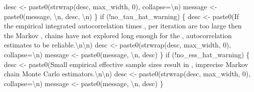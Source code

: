 \documentclass[
  letterpaper,
  DIV=11,
  numbers=noendperiod]{scrartcl}
\newenvironment{Shaded}{\begin{snugshade}}{\end{snugshade}}
\newcommand{\CharTok}[1]{\textcolor[rgb]{0.13,0.47,0.30}{#1}}
\newcommand{\ControlFlowTok}[1]{\textcolor[rgb]{0.00,0.23,0.31}{#1}}
\newcommand{\DecValTok}[1]{\textcolor[rgb]{0.68,0.00,0.00}{#1}}
\newcommand{\NormalTok}[1]{\textcolor[rgb]{0.00,0.23,0.31}{#1}}
\newcommand{\OperatorTok}[1]{\textcolor[rgb]{0.37,0.37,0.37}{#1}}
\newcommand{\StringTok}[1]{\textcolor[rgb]{0.13,0.47,0.30}{#1}}
\begin{document}
\begin{Shaded}
\begin{Highlighting}[]
\NormalTok{    desc }\OperatorTok{\textless{}{-}}\NormalTok{ paste0(strwrap(desc, max\_width, }\DecValTok{0}\NormalTok{), collapse}\OperatorTok{=}\StringTok{\textquotesingle{}}\CharTok{\textbackslash{}n}\StringTok{\textquotesingle{}}\NormalTok{)}
\NormalTok{    message }\OperatorTok{\textless{}{-}}\NormalTok{ paste0(message, }\StringTok{\textquotesingle{}}\CharTok{\textbackslash{}n}\StringTok{\textquotesingle{}}\NormalTok{, desc, }\StringTok{\textquotesingle{}}\CharTok{\textbackslash{}n}\StringTok{\textquotesingle{}}\NormalTok{)}
\NormalTok{  \}}
  \ControlFlowTok{if}\NormalTok{ (}\OperatorTok{!}\NormalTok{no\_tau\_hat\_warning) \{}
\NormalTok{    desc }\OperatorTok{\textless{}{-}}\NormalTok{ paste0(}\StringTok{\textquotesingle{}If the empirical integrated autocorrelation times \textquotesingle{}}\NormalTok{,}
                   \StringTok{\textquotesingle{}per iteration are too large then the Markov \textquotesingle{}}\NormalTok{,}
                   \StringTok{\textquotesingle{}chains have not explored long enough for the \textquotesingle{}}\NormalTok{,}
                   \StringTok{\textquotesingle{}autocorrelation estimates to be reliable.}\CharTok{\textbackslash{}n\textbackslash{}n}\StringTok{\textquotesingle{}}\NormalTok{)}
\NormalTok{    desc }\OperatorTok{\textless{}{-}}\NormalTok{ paste0(strwrap(desc, max\_width, }\DecValTok{0}\NormalTok{), collapse}\OperatorTok{=}\StringTok{\textquotesingle{}}\CharTok{\textbackslash{}n}\StringTok{\textquotesingle{}}\NormalTok{)}
\NormalTok{    message }\OperatorTok{\textless{}{-}}\NormalTok{ paste0(message, }\StringTok{\textquotesingle{}}\CharTok{\textbackslash{}n}\StringTok{\textquotesingle{}}\NormalTok{, desc)}
\NormalTok{  \}}
  \ControlFlowTok{if}\NormalTok{ (}\OperatorTok{!}\NormalTok{no\_ess\_hat\_warning) \{}
\NormalTok{    desc }\OperatorTok{\textless{}{-}}\NormalTok{ paste0(}\StringTok{\textquotesingle{}Small empirical effective sample sizes result in \textquotesingle{}}\NormalTok{,}
                   \StringTok{\textquotesingle{}imprecise Markov chain Monte Carlo estimators.}\CharTok{\textbackslash{}n\textbackslash{}n}\StringTok{\textquotesingle{}}\NormalTok{)}
\NormalTok{    desc }\OperatorTok{\textless{}{-}}\NormalTok{ paste0(strwrap(desc, max\_width, }\DecValTok{0}\NormalTok{), collapse}\OperatorTok{=}\StringTok{\textquotesingle{}}\CharTok{\textbackslash{}n}\StringTok{\textquotesingle{}}\NormalTok{)}
\NormalTok{    message }\OperatorTok{\textless{}{-}}\NormalTok{ paste0(message, }\StringTok{\textquotesingle{}}\CharTok{\textbackslash{}n}\StringTok{\textquotesingle{}}\NormalTok{, desc)}
\NormalTok{  \}}


\end{Highlighting}
\end{Shaded}
\end{document}
